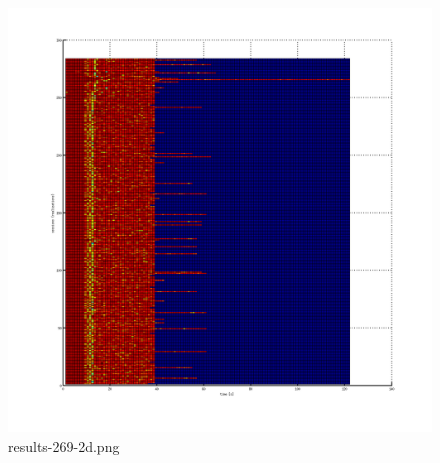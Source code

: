 \begin{figure}[htb]
	\begin{center}
	\includegraphics[width=\textwidth]{results-269-2d.png}
	\end{center}
	\caption{results-269-2d.png}
	\label{img:results-269-2d.png}
\end{figure}

